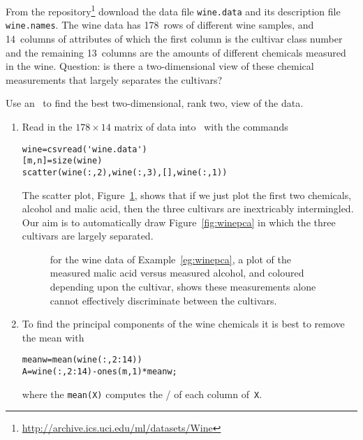 \begin{example} \label{eg:winepca}
From the \cite{Lichman2013} repository\footnote{\url{http://archive.ics.uci.edu/ml/datasets/Wine}} download the data file \verb|wine.data| and its description file \verb|wine.names|.
The wine data has 178~rows of different wine samples, and 14~columns of attributes of which the first column is the cultivar class number and the remaining 13~columns are the amounts of different chemicals measured in the wine.
Question: is there a two-dimensional view of these chemical measurements that largely separates the cultivars?

\begin{solution} 
Use an \svd\ to find the best two-dimensional, rank two, view of the data.
\begin{enumerate}
\item Read in the \(178\times14\) matrix of data into \script\ with the commands
\begin{verbatim}
wine=csvread('wine.data')
[m,n]=size(wine)
scatter(wine(:,2),wine(:,3),[],wine(:,1))
\end{verbatim}
\setbox\ajrqrbox\hbox{}%
\marginpar{\usebox{\ajrqrbox\\[2ex]}}%
The scatter plot, Figure~\ref{fig:wine12}, shows that if we just plot the first two chemicals, alcohol and malic acid, then the three cultivars are inextricably intermingled.
Our aim is to automatically draw Figure~\ref{fig:winepca} in which the three cultivars are largely separated.
\begin{figure}
\centering

\caption{for the wine data of Example~\ref{eg:winepca}, a plot of the measured malic acid versus measured alcohol, and coloured depending upon the cultivar, shows these measurements alone cannot effectively discriminate between the cultivars.}
\label{fig:wine12}
\end{figure}


\item To find the principal components of the wine chemicals it is best to remove the mean with
\begin{verbatim}
meanw=mean(wine(:,2:14))
A=wine(:,2:14)-ones(m,1)*meanw;
\end{verbatim}
where the \verb|mean(X)| computes the \slash {} of each column of~\verb|X|.


\end{enumerate}
\end{solution}
\end{example}
